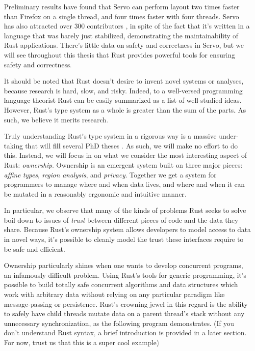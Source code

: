 Preliminary results \cite{servo-exp} have found that Servo can
perform layout two times faster than Firefox on a single thread, and four times
faster with four threads. Servo has also attracted over 300 contributors \cite{servo-gh},
in spite of the fact that it's written in a language that was barely just
stabilized, demonstrating the maintainability of Rust applications. There's
little data on safety and correctness in Servo, but we will see throughout this
thesis that Rust provides powerful tools for ensuring safety and correctness.

It should be noted that Rust doesn't desire to invent novel systems or analyses,
because research is hard, slow, and risky. Indeed, to a well-versed programming
language theorist Rust can be easily summarized as a list of well-studied
ideas. However, Rust's type system as a whole is greater than the sum
of the parts. As such, we believe it merits research.

Truly understanding Rust's type system in a rigorous way is a massive
under-taking that will fill several PhD theses \cite{rustbelt}. As such, we will make no effort
to do this. Instead, we will focus in on what we consider the most interesting
aspect of Rust: \emph{ownership}. Ownership is an emergent system built on three
major pieces: \emph{affine types}, \emph{region analysis}, and \emph{privacy}. Together we get
a system for programmers to manage where and when data lives, and where
and when it can be mutated in a reasonably ergonomic and intuitive manner.

In particular,
we observe that many of the kinds of problems Rust seeks to solve boil down
to issues of \emph{trust} between different pieces of code and the data they share.
Because Rust's ownership system allows developers to model access to data in
novel ways, it's possible to cleanly model the trust these interfaces require to be
safe and efficient.

Ownership particularly shines when one wants to develop concurrent programs,
an infamously difficult problem. Using Rust's tools for generic programming,
it's possible to build totally safe concurrent algorithms and data structures
which work with arbitrary data without relying on any particular paradigm like
message-passing or persistence. Rust's crowning jewel in this regard is the
ability to safely have child threads mutate data on a parent thread's stack
without any unnecessary synchronization, as the following program demonstrates. (If you
don't understand Rust syntax, a brief introduction is provided in a later
section. For now, trust us that this is a super cool example)

